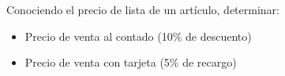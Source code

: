 Conociendo el precio de lista de un artículo, determinar:

\begin{itemize}
	\item Precio de venta al contado (10\% de descuento) 
	\item Precio de venta con tarjeta (5\% de recargo)
\end{itemize}
